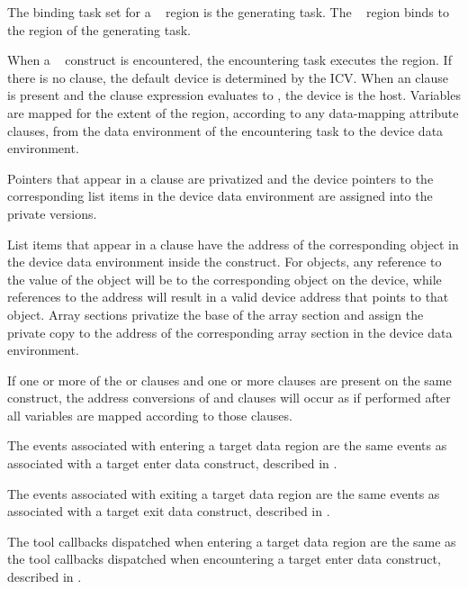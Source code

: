 \binding
The binding task set for a ~ region is the generating task. 
The ~ region binds to the region of the generating task.

\descr
When a ~ construct is encountered, the encountering task
executes the region. If there is no  clause, the default device is
determined by the  ICV. When an  clause is present 
and the  clause expression evaluates to , the device is the host.
Variables are mapped for the extent of the region, according to any data-mapping 
attribute clauses, from the data environment of the encountering task to the 
device data environment.

Pointers that appear in a  clause are privatized and the
device pointers to the corresponding list items in the device data environment
are assigned into the private versions.  

List items that appear in a  clause have the address of
the corresponding object in the device data environment inside the construct.
For objects, any reference to the value of the object will be to the
corresponding object on the device, while references to the address will result
in a valid device address that points to that object.  Array sections privatize the
base of the array section and assign the private copy to the address of the
corresponding array section in the device data environment.  

If one or more of the  or
 clauses and one or more  clauses are present on the
same construct, the address conversions of  and
 clauses will occur as if performed after all variables
are mapped according to those  clauses.

\events

The events associated with entering a target data region are the same events
as associated with a target enter data construct, described in 
. 
 
The events associated with exiting a target data region are the same events
as associated with a target exit data construct, described in
. 

\tools

The tool callbacks dispatched when entering a target data region are
the same as the tool callbacks dispatched when encountering
a target enter data construct, described in
.
 
